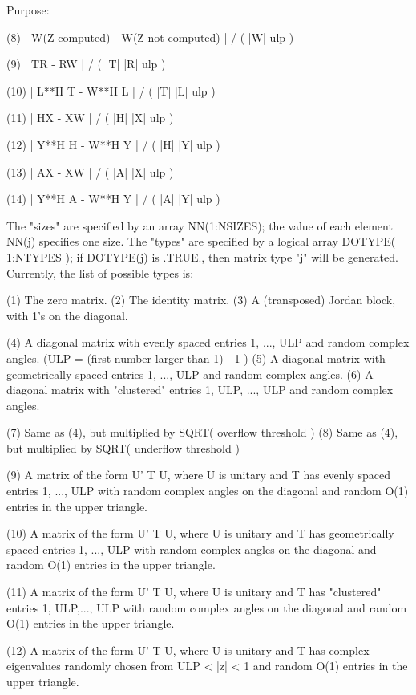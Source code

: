 \begin{DoxyParagraph}{Purpose\+: }
\begin{DoxyVerb}
    (8)     | W(Z computed) - W(Z not computed) | / ( |W| ulp )

    (9)     | TR - RW | / ( |T| |R| ulp )

    (10)    | L**H T - W**H L | / ( |T| |L| ulp )

    (11)    | HX - XW | / ( |H| |X| ulp )

    (12)    | Y**H H - W**H Y | / ( |H| |Y| ulp )

    (13)    | AX - XW | / ( |A| |X| ulp )

    (14)    | Y**H A - W**H Y | / ( |A| |Y| ulp )

    The "sizes" are specified by an array NN(1:NSIZES); the value of
    each element NN(j) specifies one size.
    The "types" are specified by a logical array DOTYPE( 1:NTYPES );
    if DOTYPE(j) is .TRUE., then matrix type "j" will be generated.
    Currently, the list of possible types is:

    (1)  The zero matrix.
    (2)  The identity matrix.
    (3)  A (transposed) Jordan block, with 1's on the diagonal.

    (4)  A diagonal matrix with evenly spaced entries
         1, ..., ULP  and random complex angles.
         (ULP = (first number larger than 1) - 1 )
    (5)  A diagonal matrix with geometrically spaced entries
         1, ..., ULP  and random complex angles.
    (6)  A diagonal matrix with "clustered" entries 1, ULP, ..., ULP
         and random complex angles.

    (7)  Same as (4), but multiplied by SQRT( overflow threshold )
    (8)  Same as (4), but multiplied by SQRT( underflow threshold )

    (9)  A matrix of the form  U' T U, where U is unitary and
         T has evenly spaced entries 1, ..., ULP with random complex
         angles on the diagonal and random O(1) entries in the upper
         triangle.

    (10) A matrix of the form  U' T U, where U is unitary and
         T has geometrically spaced entries 1, ..., ULP with random
         complex angles on the diagonal and random O(1) entries in
         the upper triangle.

    (11) A matrix of the form  U' T U, where U is unitary and
         T has "clustered" entries 1, ULP,..., ULP with random
         complex angles on the diagonal and random O(1) entries in
         the upper triangle.

    (12) A matrix of the form  U' T U, where U is unitary and
         T has complex eigenvalues randomly chosen from
         ULP < |z| < 1   and random O(1) entries in the upper
         triangle.


\end{DoxyVerb}
\end{DoxyParagraph}
